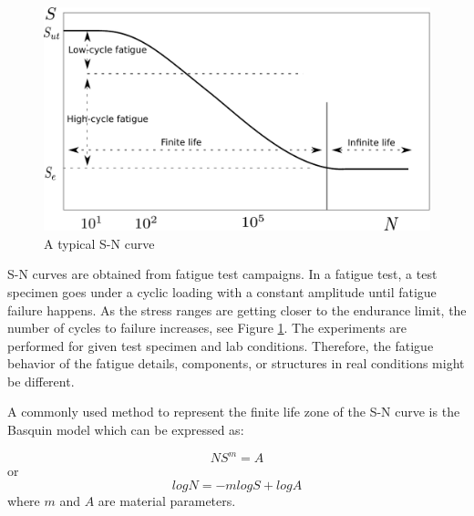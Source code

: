 \begin{figure}[hbt!]
\centering
  \includegraphics[width=0.65\linewidth]{figures/fig-ch1/s-n.pdf}
  \caption{A typical S-N curve}
  \label{fig:s-n}
\end{figure}

S-N curves are obtained from fatigue test campaigns. In a fatigue test, a test specimen goes under a cyclic loading with a constant amplitude until fatigue failure happens. As the stress 
ranges are getting closer to the endurance limit, the number of cycles to failure increases, see Figure \ref{fig:s-n}. The experiments are performed for given test specimen and lab conditions. 
Therefore, the fatigue behavior of the fatigue details, components, or structures in real conditions might be different. 

A commonly used method to represent the finite life zone of the S-N curve is the Basquin model \citep{Basquin1910} which can be expressed as:

\begin{equation}
 NS^m = A 
 \label{eq:basquin1}
\end{equation}
or
\begin{equation}
 logN = -mlogS + logA
 \label{eq:basquin2}
\end{equation}
where $m$ and $A$ are material parameters. 


